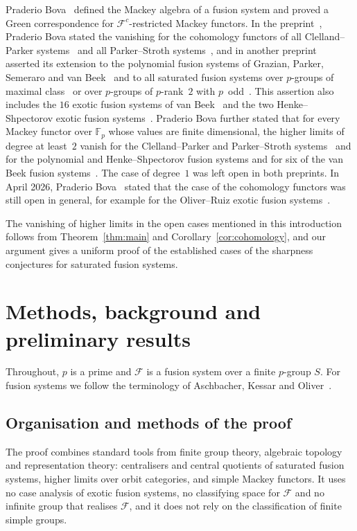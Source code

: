 \documentclass[10pt]{amsart}
\theoremstyle{definition}
\numberwithin{equation}{section}
\newcommand{\F}{\mathcal F}
\begin{document}
Praderio Bova~\cite{BovaGreen} defined the Mackey algebra of a fusion system and proved a Green correspondence for $\F^c$-restricted Mackey functors. In the preprint~\cite[Theorem~C]{BovaAmalgams}, Praderio Bova stated the vanishing for the cohomology functors of all Clelland--Parker systems~\cite{CP2010} and all Parker--Stroth systems~\cite{PS2015}, and in another preprint~\cite[Theorem~D]{BovaInductive} asserted its extension to the polynomial fusion systems of Grazian, Parker, Semeraro and van Beek~\cite{GPSvB} and to all saturated fusion systems over $p$-groups of maximal class~\cite{GP2025} or over $p$-groups of $p$-rank~$2$ with $p$~odd~\cite{DRV2007,PS2019}. This assertion also includes the $16$ exotic fusion systems of van Beek~\cite{vanBeek2025} and the two Henke--Shpectorov exotic fusion systems~\cite{HenkeShpectorov}. Praderio Bova further stated that for every Mackey functor over $\mathbb{F}_p$ whose values are finite dimensional, the higher limits of degree at least~$2$ vanish for the Clelland--Parker and \mbox{Parker--Stroth} systems~\cite[\S4]{BovaAmalgams} and for the polynomial and Henke--Shpectorov fusion systems and for six of the van Beek fusion systems~\cite[\S4]{BovaInductive}. The case of degree~$1$ was left open in both preprints. In April 2026, Praderio Bova~\cite{BovaInductive} stated that the case of the cohomology functors was still open in general, for example for the Oliver--Ruiz exotic fusion systems~\cite[Theorem~A(c)]{OR2021}.

The vanishing of higher limits in the open cases mentioned in this introduction follows from Theorem~\ref{thm:main} and Corollary~\ref{cor:cohomology}, and our argument gives a uniform proof of the established cases of the sharpness conjectures for saturated fusion systems.
\section{Methods, background and preliminary results}
Throughout, $p$ is a prime and $\F$ is a fusion system over a finite $p$-group $S$. For fusion systems we follow the terminology of Aschbacher, Kessar and Oliver~\cite{AKO}.

\subsection{Organisation and methods of the proof}
The proof combines standard tools from finite group theory, algebraic topology and representation theory: centralisers and central quotients of saturated fusion systems, higher limits over orbit categories, and simple Mackey functors. It uses no case analysis of exotic fusion systems, no classifying space for $\F$ and no infinite group that realises $\F$, and it does not rely on the classification of finite simple groups.
\end{document}
